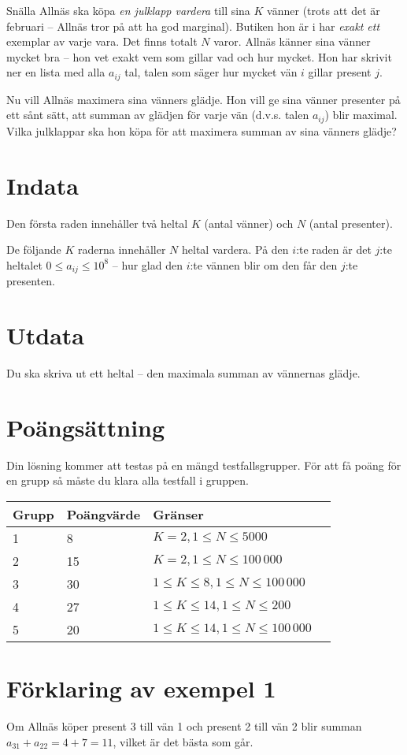 Snälla Allnäs ska köpa \emph{en julklapp vardera} till sina $K$ vänner (trots att det är februari -- Allnäs tror på att ha god marginal).
Butiken hon är i har \emph{exakt ett} exemplar av varje vara.
Det finns totalt $N$ varor.
Allnäs känner sina vänner mycket bra -- hon vet exakt vem som gillar vad och hur mycket.
Hon har skrivit ner en lista med alla $a_{ij}$ tal, talen som säger hur mycket vän $i$ gillar present $j$.

Nu vill Allnäs maximera sina vänners glädje.
Hon vill ge sina vänner presenter på ett sånt sätt, att summan av glädjen för varje vän (d.v.s. talen $a_{ij}$) blir maximal.
Vilka julklappar ska hon köpa för att maximera summan av sina vänners glädje?

\section*{Indata}
Den första raden innehåller två heltal $K$ (antal vänner) och $N$ (antal presenter).

De följande $K$ raderna innehåller $N$ heltal vardera.
På den $i$:te raden är det $j$:te heltalet $0 \le a_{ij} \le 10^8$ -- hur glad den $i$:te vännen blir om den får den $j$:te presenten.

\section*{Utdata}
Du ska skriva ut ett heltal -- den maximala summan av vännernas glädje.

\section*{Poängsättning}
Din lösning kommer att testas på en mängd testfallsgrupper. För att få poäng för en grupp
så måste du klara alla testfall i gruppen.

\noindent
\begin{tabular}{| l | l | l | l |}
\hline
Grupp & Poängvärde & Gränser \\ \hline
1     & 8          & $K = 2, 1 \le N \le 5000$ \\ \hline
2     & 15         & $K = 2, 1 \le N \le 100\,000$ \\ \hline
3     & 30         & $1 \le K \le 8, 1 \le N \le 100\,000$ \\ \hline
4     & 27         & $1 \le K \le 14, 1 \le N \le 200$ \\ \hline
5     & 20         & $1 \le K \le 14, 1 \le N \le 100\,000$ \\ \hline
\end{tabular}

\section*{Förklaring av exempel 1}
Om Allnäs köper present 3 till vän 1 och present 2 till vän 2 blir summan $a_{31} + a_{22} = 4 + 7 = 11$, vilket är det bästa som går.
